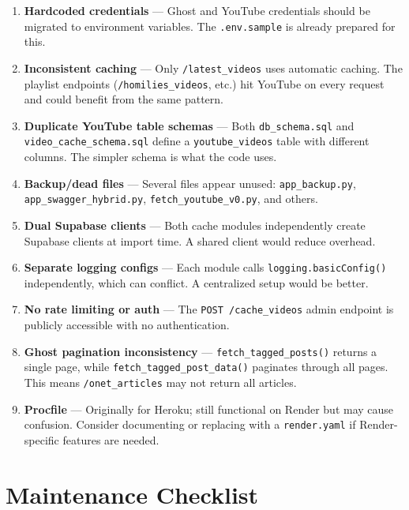 \documentclass[12pt]{article}
\begin{document}
\begin{enumerate}
    \item \textbf{Hardcoded credentials} --- Ghost and YouTube credentials should be migrated to environment variables. The \texttt{.env.sample} is already prepared for this.
    \item \textbf{Inconsistent caching} --- Only \texttt{/latest\_videos} uses automatic caching. The playlist endpoints (\texttt{/homilies\_videos}, etc.) hit YouTube on every request and could benefit from the same pattern.
    \item \textbf{Duplicate YouTube table schemas} --- Both \texttt{db\_schema.sql} and \texttt{video\_cache\_schema.sql} define a \texttt{youtube\_videos} table with different columns. The simpler schema is what the code uses.
    \item \textbf{Backup/dead files} --- Several files appear unused: \texttt{app\_backup.py}, \texttt{app\_swagger\_hybrid.py}, \texttt{fetch\_youtube\_v0.py}, and others.
    \item \textbf{Dual Supabase clients} --- Both cache modules independently create Supabase clients at import time. A shared client would reduce overhead.
    \item \textbf{Separate logging configs} --- Each module calls \texttt{logging.basicConfig()} independently, which can conflict. A centralized setup would be better.
    \item \textbf{No rate limiting or auth} --- The \texttt{POST /cache\_videos} admin endpoint is publicly accessible with no authentication.
    \item \textbf{Ghost pagination inconsistency} --- \texttt{fetch\_tagged\_posts()} returns a single page, while \texttt{fetch\_tagged\_post\_data()} paginates through all pages. This means \texttt{/onet\_articles} may not return all articles.
    \item \textbf{Procfile} --- Originally for Heroku; still functional on Render but may cause confusion. Consider documenting or replacing with a \texttt{render.yaml} if Render-specific features are needed.
\end{enumerate}

\section{Maintenance Checklist}
\label{sec:checklist}
\end{document}
